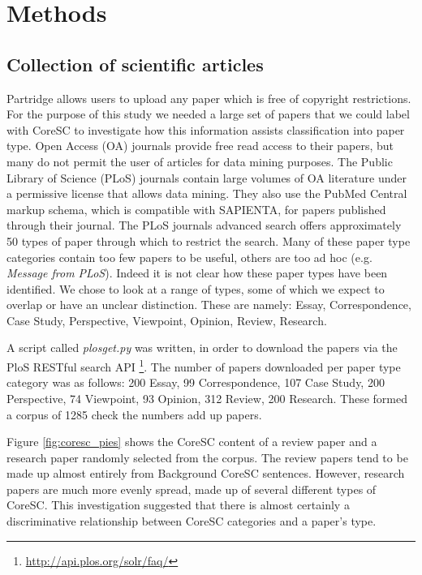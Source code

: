 \documentclass{svmult}
\begin{document}
\vspace{-15pt}
\section{Methods}
\label{sec:2}

\subsection*{Collection of scientific articles} 
\vspace{-15pt}
Partridge allows users to upload any paper which is free of copyright
restrictions.  For the purpose of this study we needed a large set of papers
that we could label with CoreSC to investigate how this information assists
classification into paper type.  Open Access (OA) journals provide free read
access to their papers, but many do not permit the user of articles for data
mining purposes. The Public Library of Science (PLoS) journals contain large
volumes of OA literature under a permissive license that allows data mining.
They also use the PubMed Central markup schema, which is compatible with
SAPIENTA, for papers published through their journal. The PLoS journals
advanced search offers approximately 50 types of paper through which to
restrict the search.  Many of these paper type categories contain too few
papers to be useful, others are too ad hoc (e.g.  {\it Message from PLoS}).
Indeed it is not clear how these paper types have been identified. We chose to
look at a range of types, some of which we expect to overlap or have an unclear
distinction.  These are namely: Essay, Correspondence, Case Study, Perspective,
Viewpoint, Opinion, Review, Research. 

A script called {\em plosget.py} was written, in order to download the
papers via the PloS RESTful search API \footnote{\url{http://api.plos.org/solr/faq/}}. The number of papers downloaded per
paper type category was as follows: 200 Essay, 99 Correspondence, 107 Case
Study, 200 Perspective, 74 Viewpoint, 93 Opinion, 312 Review, 200 Research.
These formed a corpus of 1285 %
check the numbers add up papers.

Figure \ref{fig:coresc_pies} shows the CoreSC content of a review paper and a
research paper randomly selected from the corpus.  The review papers tend to be
made up almost entirely from Background CoreSC sentences.  However, research
papers are much more evenly spread, made up of several different types of
CoreSC.  This investigation suggested that there is almost certainly a
discriminative relationship between CoreSC categories and a paper's type. 
\end{document}
